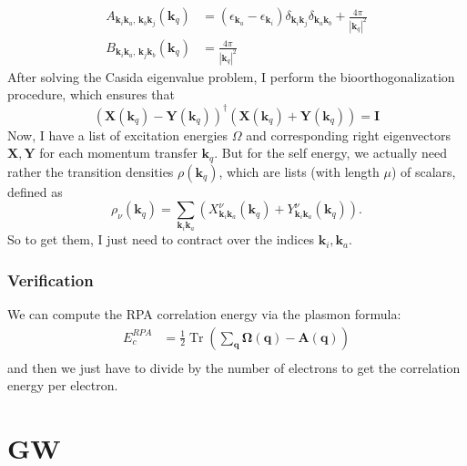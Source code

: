 \begin{align}
    A_{\bm{k}_i \bm{k}_a,\, \bm{k}_b \bm{k}_j }(\bm{k}_q) &= \left(\epsilon_{\bm{k}_a}-\epsilon_{\bm{k}_i}\right) \delta_{\bm{k}_i \bm{k}_j} \delta_{\bm{k}_a \bm{k}_b} + \frac{4\pi}{|\bm{k}_q|^2} \\
    B_{\bm{k}_i \bm{k}_a,\, \bm{k}_j \bm{k}_b}(\bm{k}_q) &= \frac{4\pi}{|\bm{k}_q|^2}
\end{align}
After solving the Casida eigenvalue problem, I perform the bioorthogonalization procedure, which ensures that
\begin{equation}
    \left(\bm{X}(\bm{k}_q) - \bm{Y}(\bm{k}_q)\right)^\dagger \left(\bm{X}(\bm{k}_q) + \bm{Y}(\bm{k}_q)\right) = \bm{I}
\end{equation}
Now, I have a list of excitation energies $\Omega$ and corresponding right eigenvectors $\bm{X}, \bm{Y}$ for each momentum transfer $\bm{k}_q$. But for the self energy, we actually need rather the transition densities $\rho(\bm{k}_q)$, which are lists (with length $\mu$) of scalars, defined as
\begin{equation}
    \rho_{\nu}(\bm{k}_q) = \sum_{\bm{k}_i \bm{k}_a} \left(X_{\bm{k}_i \bm{k}_a}^\nu(\bm{k}_q) + Y_{\bm{k}_i \bm{k}_a}^\nu(\bm{k}_q)\right).
\end{equation}
So to get them, I just need to contract over the indices $\bm{k}_i, \bm{k}_a$.
\subsubsection{Verification}
We can compute the RPA correlation energy via the plasmon formula:
\begin{align}
    E_c^{RPA} & = \frac{1}{2} \operatorname{Tr}(\sum_{\bm{q}} \bm{\Omega }(\bm{q}) -\bm{A}(\bm{q})) \\
\end{align}
and then we just have to divide by the number of electrons to get the correlation energy per electron.
\section{GW}

